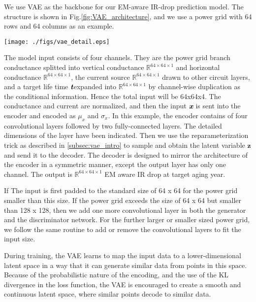 We use VAE as the backbone for our EM-aware IR-drop prediction model. The structure is shown in Fig.\ref{fig:VAE_architecture}, and we use a power grid with 64 rows and 64 columns as an example.

\begin{figure*}[h!]
	\centering
	\texttt{[image: ./figs/vae\_detail.eps]}
	\caption{VAE-based model for EM-aware IR drop prediction} 
	\label{fig:VAE_architecture}
\end{figure*}


The model input consists of four channels. They are the power grid branch conductance splitted into vertical conductance $\mathbb{R} ^{64\times 64\times 1}$ and horizontal conductance $\mathbb{R} ^{64\times 64\times 1}$, the current source $\mathbb{R} ^{64\times 64\times 1}$ drawn to other circuit layers, and a target life time $\textit{\textbf{t}} $expanded into $\mathbb{R} ^{64\times 64\times 1}$ by channel-wise duplication as the conditional information. Hence the total input will be 64x64x4. 
The conductance and current are normalized, and then the input $\textit{\textbf{x}}$ is sent into the encoder and encoded as $ \mu_{x} $  and $ \sigma_{x}$. 
In this example, the encoder contains of four convolutional layers followed by two fully-connected layers. The detailed dimensions of the layer have been indicated. 
Then we use the reparameterization trick as described in \ref{subsec:vae_intro}  to sample and obtain the latent variable $\textbf{z}$ and send it to the decoder.
The decoder is designed to mirror the architecture of the encoder in a symmetric manner, except the output layer has only one channel. The output is $\mathbb{R} ^{64\times 64\times 1}$ EM aware IR drop at target aging year.


If The input is first padded to the standard size of 64 x 64 for the power grid smaller than this size. If the power grid exceeds the size of 64 x 64 but smaller than 128 x 128, then we add one more convolutional layer in both the generator and the discriminator network. 
For the further larger or smaller sized power grid, we follow the same routine to add or remove the convolutional layers to fit the input size.


During training, the VAE learns to map the input data to a lower-dimensional latent space in a way that it can generate similar data from points in this space. Because of the probabilistic nature of the encoding, and the use of the KL divergence in the loss function, the VAE is encouraged to create a smooth and continuous latent space, where similar points decode to similar data.






